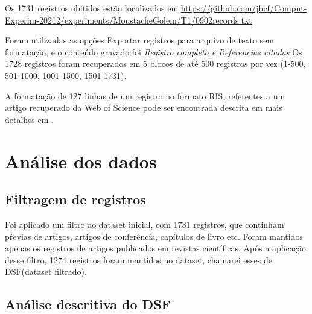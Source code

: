 \begin{itemize}
Os 1731 registros obitidos estão localizados em \url{https://github.com/jhcf/Comput-Experim-20212/experiments/MoustacheGolem/T1/0902records.txt}

Foram utilizadas as opções Exportar registros para arquivo de texto \newline sem formatação,  e o conteúdo gravado foi \textit{Registro completo e Referencias citadas}
Os 1728 registros foram recuperados em 5
blocos de até 500 registros por vez (1-500, 501-1000, 1001-1500, 
1501-1731).

A formatação de 127 linhas de um registro no formato RIS, referentes a um artigo recuperado da Web of Science pode ser encontrada descrita em mais detalhes em \citep{wikipedia_ris_2017}.

\end{itemize}

\section{Análise dos dados}

\subsection{Filtragem de registros}

Foi aplicado um filtro ao dataset  inicial, com 1731 registros, que continham pŕevias de artigos, artigos de conferência, capítulos de livro etc. Foram mantidos apenas os registros de artigos publicados em revistas científicas. Após a aplicação desse filtro, 1274 registros foram mantidos no dataset, chamarei esses de DSF(dataset filtrado).

\subsection{Análise descritiva do DSF}


